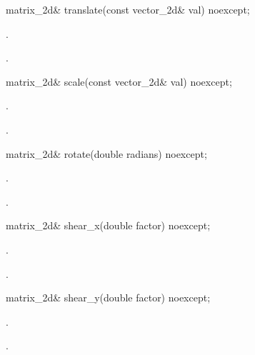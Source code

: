 \begin{itemdecl}
matrix_2d& translate(const vector_2d& val) noexcept;
\end{itemdecl}
\begin{itemdescr}
\pnum
\effects
{}.

\pnum
\returns
{}.
\end{itemdescr}

\begin{itemdecl}
matrix_2d& scale(const vector_2d& val) noexcept;
\end{itemdecl}
\begin{itemdescr}
\pnum
\effects
{}.

\pnum
\returns
{}.
\end{itemdescr}

\begin{itemdecl}
matrix_2d& rotate(double radians) noexcept;
\end{itemdecl}
\begin{itemdescr}
\pnum
\effects
{}.

\pnum
\returns
{}.
\end{itemdescr}

\begin{itemdecl}
matrix_2d& shear_x(double factor) noexcept;
\end{itemdecl}
\begin{itemdescr}
\pnum
\effects
{}.

\pnum
\returns
{}.
\end{itemdescr}

\begin{itemdecl}
matrix_2d& shear_y(double factor) noexcept;
\end{itemdecl}
\begin{itemdescr}
\pnum
\effects
{}.

\pnum
\returns
{}.
\end{itemdescr}

